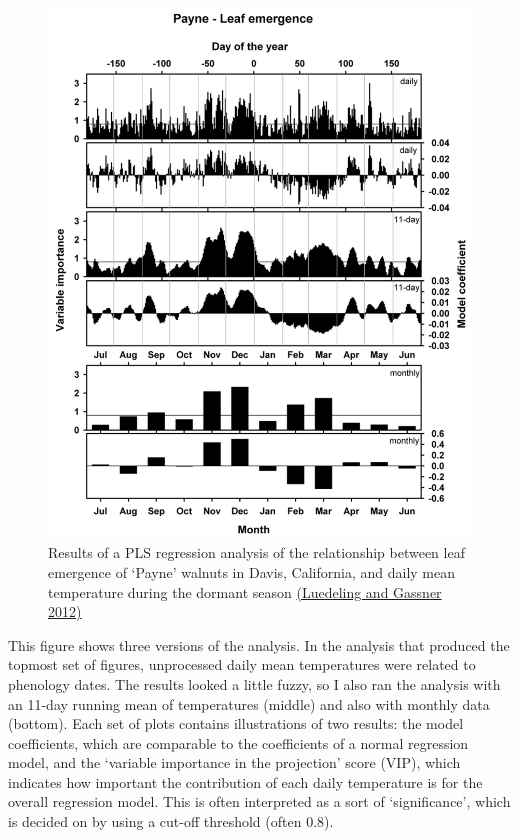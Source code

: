\documentclass[
]{book}
\begin{document}
\begin{figure}
\centering
\includegraphics{pictures/PLS_Payne.png}
\caption{Results of a PLS regression analysis of the relationship between leaf emergence of `Payne' walnuts in Davis, California, and daily mean temperature during the dormant season \href{https://www.sciencedirect.com/science/article/abs/pii/S0168192312000561}{(Luedeling and Gassner \protect\hyperlink{ref-luedeling2012partial}{2012})}}
\end{figure}

This figure shows three versions of the analysis. In the analysis that produced the topmost set of figures, unprocessed daily mean temperatures were related to phenology dates. The results looked a little fuzzy, so I also ran the analysis with an 11-day running mean of temperatures (middle) and also with monthly data (bottom). Each set of plots contains illustrations of two results: the model coefficients, which are comparable to the coefficients of a normal regression model, and the `variable importance in the projection' score (VIP), which indicates how important the contribution of each daily temperature is for the overall regression model. This is often interpreted as a sort of `significance', which is decided on by using a cut-off threshold (often 0.8).
\end{document}
